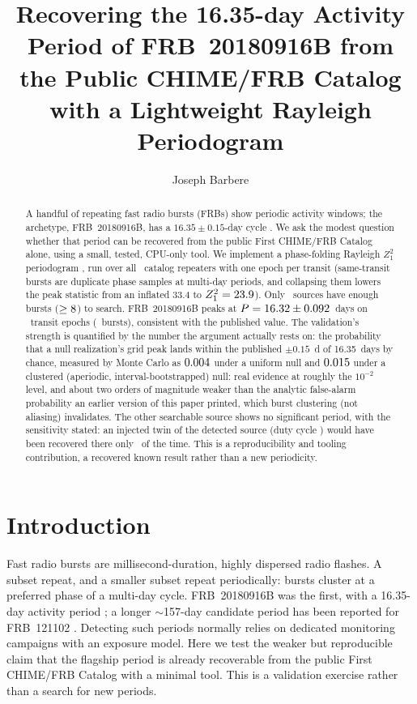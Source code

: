 \documentclass[twocolumn]{aastex631}
\begin{document}
\title{Recovering the 16.35-day Activity Period of FRB~20180916B from the Public
CHIME/FRB Catalog with a Lightweight Rayleigh Periodogram}

\author[0009-0008-3289-4447]{Joseph Barbere}

\begin{abstract}
A handful of repeating fast radio bursts (FRBs) show periodic activity windows; the archetype,
FRB~20180916B, has a $16.35\pm0.15$-day cycle \citep{chime2020periodic}. We ask the modest question whether that period
can be recovered from the public First CHIME/FRB Catalog alone, using a small, tested, CPU-only
tool. We implement a phase-folding Rayleigh $Z^2_1$ periodogram \citep{buccheri1983}, run over
all \fpNsources\ catalog repeaters with one epoch per transit (same-transit bursts are duplicate
phase samples at multi-day periods, and collapsing them lowers the peak statistic from an inflated
33.4 to $Z^2_1=23.9$). Only \fpNsearch\ sources have enough bursts ($\geq8$) to
search. FRB~20180916B peaks at $P=16.32\pm0.092$~days on \fpNepochs\ transit epochs
(\fpNbursts\ bursts), consistent with the published value. The validation's strength is
quantified by the number the argument actually rests on: the probability that a null
realization's grid peak lands within the published $\pm0.15$~d of 16.35~days by chance, measured
by Monte Carlo as $0.004$ under a uniform null and $0.015$ under a clustered
(aperiodic, interval-bootstrapped) null: real evidence at roughly the $10^{-2}$ level, and
about two orders of magnitude weaker than the analytic false-alarm probability an earlier
version of this paper printed, which burst clustering (not aliasing) invalidates. The other
searchable source shows no significant period, with the sensitivity stated: an injected twin of
the detected source (duty cycle \fpDuty) would have been recovered there only \fpTwinPower\ of
the time. This is a reproducibility and tooling contribution, a recovered known result rather
than a new periodicity.
\end{abstract}


\section{Introduction}
Fast radio bursts are millisecond-duration, highly dispersed radio flashes. A subset repeat, and a
smaller subset repeat periodically: bursts cluster at a preferred phase of a multi-day cycle.
FRB~20180916B was the first, with a 16.35-day activity period \citep{chime2020periodic}; a longer
$\sim$157-day candidate period has been reported for FRB~121102 \citep{rajwade2020}. Detecting such
periods normally relies on dedicated monitoring campaigns with an exposure model. Here we test the
weaker but reproducible claim that the flagship period is already recoverable from the public
First CHIME/FRB Catalog \citep{chimecat1} with a minimal tool. This is a validation exercise rather than a
search for new periods.
\end{document}
